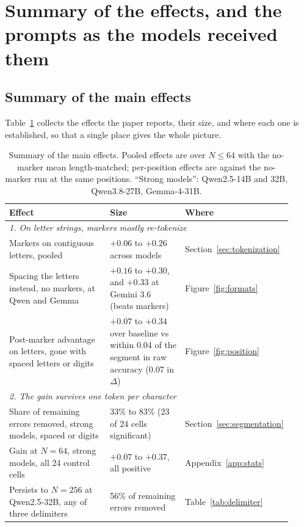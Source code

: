 \documentclass[10pt]{article} %
\begin{document}
\FloatBarrier
\section{Summary of the effects, and the prompts as the models received them}

\subsection{Summary of the main effects}
\label{app:summary}

Table~\ref{tab:summary} collects the effects the paper reports, their size, and where each one is established, so that a single place gives the whole picture.

\begin{table}[!htbp]
\centering
\footnotesize
\renewcommand{\arraystretch}{0.95}
\caption{Summary of the main effects. Pooled effects are over $N \le 64$ with the no-marker mean length-matched; per-position effects are against the no-marker run at the same positions. ``Strong models'': Qwen2.5-14B and 32B, Qwen3.8-27B, Gemma-4-31B.}
\label{tab:summary}
\begin{tabular}{p{0.43\linewidth} p{0.30\linewidth} p{0.19\linewidth}}
\toprule
Effect & Size & Where \\
\midrule
\multicolumn{3}{l}{\emph{1. On letter strings, markers mostly re-tokenize}} \\
Markers on contiguous letters, pooled & $+0.06$ to $+0.26$ across models & Section~\ref{sec:tokenization} \\
Spacing the letters instead, no markers, at Qwen and Gemma & $+0.16$ to $+0.30$, and $+0.33$ at Gemini 3.6 (beats markers) & Figure~\ref{fig:formats} \\
Post-marker advantage on letters, gone with spaced letters or digits & $+0.07$ to $+0.34$ over baseline vs within 0.04 of the segment in raw accuracy (0.07 in $\Delta$) & Figure~\ref{fig:position} \\
\midrule
\multicolumn{3}{l}{\emph{2. The gain survives one token per character}} \\
Share of remaining errors removed, strong models, spaced or digits & 33\% to 83\% (23 of 24 cells significant) & Section~\ref{sec:segmentation} \\
Gain at $N = 64$, strong models, all 24 control cells & $+0.07$ to $+0.37$, all positive & Appendix~\ref{app:stats} \\
Persists to $N = 256$ at Qwen2.5-32B, any of three delimiters & 56\% of remaining errors removed & Table~\ref{tab:delimiter} \\

\end{tabular}
\end{table}
\end{document}
